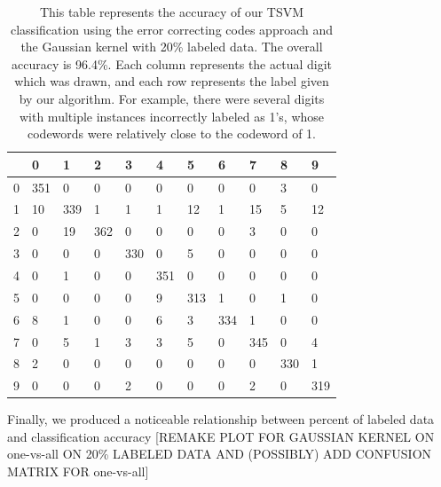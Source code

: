 \documentclass[11pt]{article}
\begin{document}
\begin{table}[]
  \centering
  \caption{This table represents the accuracy of our TSVM classification using
  the error correcting codes approach and the Gaussian kernel
 with 20\% labeled data. The overall accuracy is 96.4\%. Each column represents the actual digit which was drawn, and each row represents the label given by our algorithm. For example, there were several digits with multiple instances
  incorrectly labeled as 1's, whose codewords were relatively close to the
  codeword of 1.}
  \label{my-table}
  \vspace{.3in}
  \begin{tabular}{l|llllllllll}
    & 0 & 1 & 2 & 3 & 4 & 5 & 6 & 7 & 8 & 9\\\hline
    0 &351 & 0   & 0   & 0   & 0   & 0   & 0   & 0   & 3   & 0   \\
    1 &10   & 339 & 1  & 1   & 1   & 12   & 1   & 15  & 5   & 12  \\
    2 & 0   & 19  & 362 & 0   & 0   & 0   & 0   & 3   & 0   & 0   \\
    3 & 0   & 0   & 0   & 330 & 0   & 5  & 0   & 0   & 0   & 0   \\
    4 & 0   & 1   & 0   & 0   & 351 & 0   & 0   & 0  & 0   & 0   \\
    5 & 0   & 0  & 0   & 0   & 9  & 313 & 1   & 0   & 1  & 0  \\
    6 & 8   & 1   & 0   & 0   & 6   & 3   & 334 & 1   & 0   & 0   \\
    7 & 0   & 5   & 1   & 3   & 3   & 5   & 0   & 345 & 0   & 4   \\
    8 & 2  & 0   & 0   & 0   & 0   & 0   & 0   & 0   & 330 & 1   \\
    9 & 0   & 0   & 0   & 2   & 0  & 0  & 0   & 2   & 0   & 319
  \end{tabular}
  \end{table}

Finally, we produced a noticeable relationship between percent of labeled data and classification accuracy [REMAKE PLOT FOR GAUSSIAN KERNEL ON
one-vs-all ON 20\% LABELED DATA AND (POSSIBLY) ADD CONFUSION MATRIX
FOR one-vs-all] \par
\end{document}
